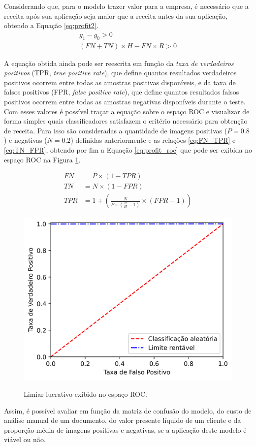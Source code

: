 Considerando que, para o modelo trazer valor para a empresa, é necessário que a receita após sua aplicação seja maior que a receita antes da sua aplicação, obtendo a Equação \eqref{eq:profit2}.
\begin{align} \label{eq:profit2}
    g_1 - g_0 > 0 \\
    (FN + TN) \times H - FN \times R > 0
\end{align}

A equação obtida ainda pode ser reescrita em função da \textit{taxa de verdadeiros positivos} (TPR, \textit{true positive rate}), que define quantos resultados verdadeiros positivos ocorrem entre todas as amostras positivas disponíveis, e da taxa de falsos positivos (FPR, \textit{false positive rate}), que define quantos resultados falsos positivos ocorrem entre todas as amostras negativas disponíveis durante o teste. Com esses valores é possível traçar a equação sobre o espaço ROC e visualizar de forma simples quais classificadores satisfazem o critério necessário para obtenção de receita. Para isso são consideradas a quantidade de imagens positivas ($ P = 0.8 $) e negativas ($ N = 0.2 $) definidas anteriormente e as relações \eqref{eq:FN_TPR} e \eqref{eq:TN_FPR}, obtendo por fim a Equação \eqref{eq:profit_roc} que pode ser exibida no espaço ROC na Figura \ref{fig:profit_roc}.

\begin{align}
    \label{eq:FN_TPR}
    FN  & = P \times (1-TPR)                                                                     \\
    \label{eq:TN_FPR}
    TN  & = N \times (1-FPR)                                                                     \\
    \label{eq:profit_roc}
    TPR & = 1 + \left( \frac{N}{P \times \left( \frac{R}{H}-1 \right) } \times (FPR - 1) \right)
\end{align}

\begin{figure}[htb]
    \centering
    \caption{Limiar lucrativo exibido no espaço ROC.}
    \includegraphics[scale=1]{figs/curva_roc_lucro.png}
    \label{fig:profit_roc}
\end{figure}

Assim, é possível avaliar em função da matriz de confusão do modelo, do custo de análise manual de um documento, do valor presente líquido de um cliente e da proporção média de imagens positivas e negativas, se a aplicação deste modelo é viável ou não.
